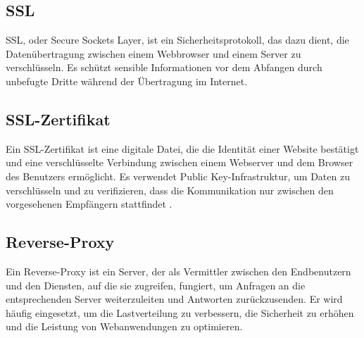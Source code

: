 \subsection{SSL}
\label{subsec:ssl}
SSL, oder Secure Sockets Layer, ist ein Sicherheitsprotokoll, das dazu dient, die Datenübertragung zwischen einem Webbrowser und einem Server zu verschlüsseln. Es schützt sensible Informationen vor dem Abfangen durch unbefugte Dritte während der Übertragung im Internet.

\subsection{SSL-Zertifikat}
\label{subsec:sslcertificate}
Ein SSL-Zertifikat ist eine digitale Datei, die die Identität einer Website bestätigt und eine verschlüsselte Verbindung zwischen einem Webserver und dem Browser des Benutzers ermöglicht. Es verwendet Public Key-Infrastruktur, um Daten zu verschlüsseln und zu verifizieren, dass die Kommunikation nur zwischen den vorgesehenen Empfängern stattfindet \cite {SSLcertificate}.

\subsection{Reverse-Proxy}
\label{subsec:reverseproxy}
Ein Reverse-Proxy ist ein Server, der als Vermittler zwischen den Endbenutzern und den Diensten, auf die sie zugreifen, fungiert, um Anfragen an die entsprechenden Server weiterzuleiten und Antworten zurückzusenden. Er wird häufig eingesetzt, um die Lastverteilung zu verbessern, die Sicherheit zu erhöhen und die Leistung von Webanwendungen zu optimieren\cite{Reverseproxy}.





